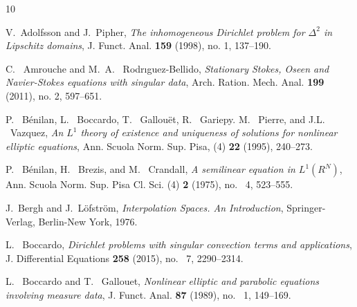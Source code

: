 \documentclass[reqno,centertags,11pt]{amsart}
\theoremstyle{definition}
\numberwithin{thm}{section}
\numberwithin{equation}{section}
\newcommand{\R}{{\mathbb{R}}}
\begin{document}
\begin{thebibliography}{10}


V.~Adolfsson and J.~Pipher, \emph{The inhomogeneous Dirichlet problem for $\Delta^2$ in Lipschitz domains}, J. Funct. Anal. \textbf{159} (1998), no. 1, 137--190.


C. ~Amrouche and M.~A. ~Rodrıguez-Bellido, \emph{Stationary Stokes, Oseen and Navier-Stokes equations with singular data}, Arch. Ration. Mech. Anal. \textbf{199} (2011), no. 2, 597--651.





P. ~B\'{e}nilan, L. ~Boccardo, T. ~Gallouët, R. ~Gariepy. M. ~Pierre, and J.L. ~Vazquez, \emph{An $L^1$ theory of existence and uniqueness of solutions for nonlinear elliptic equations},  Ann. Scuola Norm. Sup. Pisa, (4) \textbf{22} (1995), 240--273.

P. ~B\'{e}nilan, H. ~Brezis, and M. ~Crandall, \emph{A semilinear equation in $L^1(R^N)$}, Ann. Scuola Norm. Sup. Pisa Cl. Sci. (4) \textbf{2} (1975), no. ~4, 523--555.

J.~Bergh and J.~L\"ofstr\"om, \emph{Interpolation {S}paces. {A}n
  {I}ntroduction}, Springer-Verlag, Berlin-New York, 1976.



L. ~Boccardo, \emph{Dirichlet problems with singular convection terms and applications}, J. Differential Equations \textbf{258} (2015), no. ~7, 2290--2314.


 L. ~Boccardo and T. ~Gallouet, \emph{Nonlinear elliptic and parabolic equations involving measure data},
J. Funct. Anal. \textbf{87} (1989), no. ~1, 149--169.


\end{thebibliography}
\end{document}
